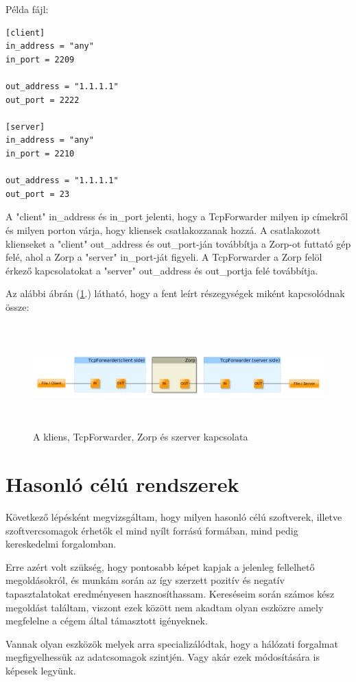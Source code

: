 \documentclass[a4paper,12pt,oneside]{report}
\begin{document}
Példa fájl:
\begin{lstlisting}
[client]
in_address = "any"
in_port = 2209

out_address = "1.1.1.1"
out_port = 2222

[server]
in_address = "any"
in_port = 2210

out_address = "1.1.1.1"
out_port = 23
\end{lstlisting}

A "client" in\_address és in\_port jelenti, hogy a TcpForwarder milyen ip címekről és milyen porton várja, hogy kliensek csatlakozzanak hozzá.
A csatlakozott klienseket a "client" out\_address és out\_port-ján továbbítja a Zorp-ot futtató gép felé, ahol a Zorp a "server" in\_port-ját figyeli.
A TcpForwarder a Zorp felöl érkező kapcsolatokat a "server" out\_address és out\_portja felé továbbítja.

Az alábbi ábrán (\ref{fig:streams}.) látható, hogy a fent leírt részegységek miként kapcsolódnak össze:
\begin{center}
\begin{figure}[h]
  \includegraphics[width=1.1\textwidth,height=4cm]{streams.png}
  \caption{A kliens, TcpForwarder, Zorp és szerver kapcsolata}
  \label{fig:streams}
\end{figure}
\end{center}
\newpage
\section{Hasonló célú rendszerek}
Következő lépésként megvizsgáltam, hogy milyen hasonló célú szoftverek, illetve
szoftvercsomagok érhetők el mind nyílt forrású formában, mind pedig kereskedelmi forgalomban.

Erre azért volt szükség, hogy pontosabb képet kapjak a jelenleg fellelhető megoldásokról, és munkám során az így szerzett pozitív és negatív tapasztalatokat eredményesen hasznosíthassam.
Kereséseim során számos kész megoldást találtam, viszont ezek között nem akadtam olyan eszközre amely megfelelne a cégem által támasztott igényeknek.

Vannak olyan eszközök melyek arra specializálódtak, hogy a hálózati forgalmat megfigyelhessük az adatcsomagok szintjén. Vagy akár ezek módosítására is képesek legyünk.
\end{document}
